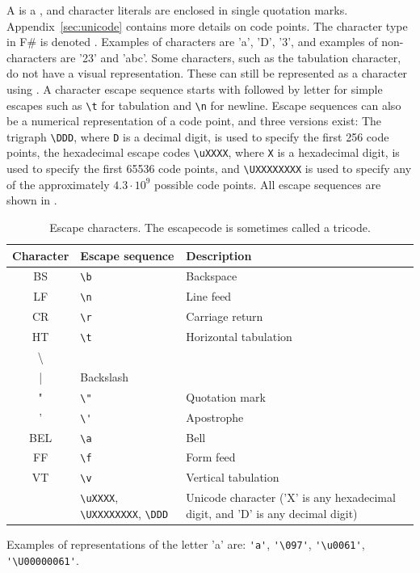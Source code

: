 \documentclass[fsharpNotes.tex]{subfiles}
\begin{document}
A  is a  , and character literals are enclosed in single quotation marks. Appendix~\ref{sec:unicode} contains more details on code points. The character type in F\# is denoted .  Examples of characters are 'a', 'D', '3', and examples of non-characters are '23' and 'abc'. Some characters, such as the tabulation character, do not have a visual representation. These can still be represented as a character using . A character escape sequence starts with \lexeme{\\} followed by letter for simple escapes such as \lstinline{\t} for tabulation and \lstinline{\n} for newline. Escape sequences can also be a numerical representation of a code point, and three versions exist: The trigraph \lstinline|\DDD|, where \lstinline{D} is a decimal digit, is used to specify the first 256 code points, the hexadecimal escape codes \lstinline|\uXXXX|, where \lstinline{X} is a hexadecimal digit, is used to specify the first 65536 code points, and \lstinline|\UXXXXXXXX| is used to specify any of the approximately $4.3\cdot 10^9$ possible code points. All escape sequences are shown in .
%
\begin{table}
  \centering
  \begin{tabular}{|c|p{}|p{}|}
    \hline
    \rowcolor{headerRowColor} Character& Escape sequence & Description\\
    \hline
    BS &\lstinline|\b|& Backspace\\
    LF &\lstinline|\n|&Line feed\\
    CR &\lstinline|\r|&Carriage return\\
    HT &\lstinline|\t|&Horizontal tabulation\\
    \textbackslash &\lstinline|\\|&Backslash\\
     " &\lstinline|\"|&Quotation mark\\
    ' &\lstinline|\'|&Apostrophe\\
    BEL&\lstinline|\a|& Bell\\
    FF&\lstinline|\f|&Form feed\\
    VT &\lstinline|\v|&Vertical tabulation\\
    &\lstinline|\uXXXX|, \lstinline|\UXXXXXXXX|, \lstinline|\DDD|&Unicode character ('X' is any hexadecimal digit, and 'D' is any decimal digit)\\
    \hline
  \end{tabular}
  \caption{Escape characters. The escapecode  is sometimes called a tricode.}
  \label{tab:escapeChar}
\end{table}
%
Examples of  representations of the letter 'a' are: \lstinline{'a'}, \lstinline{'\097'}, \lstinline{'\u0061'}, \lstinline{'\U00000061'}.
\end{document}
